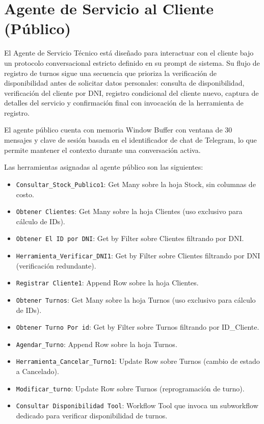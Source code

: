 \documentclass[12pt,a4paper]{report}
\begin{document}
\section{Agente de Servicio al Cliente (Público)}
\label{sec:agente-cliente}

El Agente de Servicio Técnico está diseñado para interactuar con el cliente bajo un protocolo conversacional estricto definido en su prompt de sistema. Su flujo de registro de turnos sigue una secuencia que prioriza la verificación de disponibilidad antes de solicitar datos personales: consulta de disponibilidad, verificación del cliente por DNI, registro condicional del cliente nuevo, captura de detalles del servicio y confirmación final con invocación de la herramienta de registro.

El agente público cuenta con memoria Window Buffer con ventana de 30 mensajes y clave de sesión basada en el identificador de chat de Telegram, lo que permite mantener el contexto durante una conversación activa.

Las herramientas asignadas al agente público son las siguientes:

\begin{itemize}
  \item \texttt{Consultar\_Stock\_Publico1}: Get Many sobre la hoja Stock, sin columnas de costo.
  \item \texttt{Obtener Clientes}: Get Many sobre la hoja Clientes (uso exclusivo para cálculo de IDs).
  \item \texttt{Obtener El ID por DNI}: Get by Filter sobre Clientes filtrando por DNI.
  \item \texttt{Herramienta\_Verificar\_DNI1}: Get by Filter sobre Clientes filtrando por DNI (verificación redundante).
  \item \texttt{Registrar Cliente1}: Append Row sobre la hoja Clientes.
  \item \texttt{Obtener Turnos}: Get Many sobre la hoja Turnos (uso exclusivo para cálculo de IDs).
  \item \texttt{Obtener Turno Por id}: Get by Filter sobre Turnos filtrando por ID\_Cliente.
  \item \texttt{Agendar\_Turno}: Append Row sobre la hoja Turnos.
  \item \texttt{Herramienta\_Cancelar\_Turno1}: Update Row sobre Turnos (cambio de estado a Cancelado).
  \item \texttt{Modificar\_turno}: Update Row sobre Turnos (reprogramación de turno).
  \item \texttt{Consultar Disponibilidad Tool}: Workflow Tool que invoca un subworkflow dedicado para verificar disponibilidad de turnos.
\end{itemize}
\end{document}
